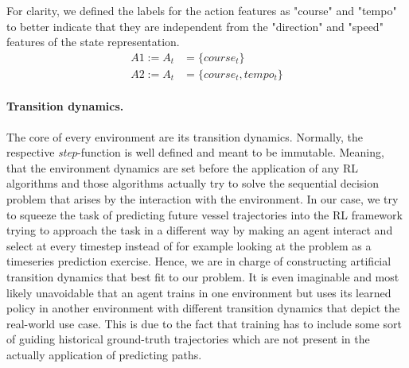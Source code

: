 For clarity, we defined the labels for the action features as "course" and "tempo" to better indicate that they are independent from the "direction" and "speed" features of the state representation.
\begin{equation}
\begin{aligned}
    A1 := A_t &= \{course_t\}
\\
    A2 := A_t &= \{course_t, tempo_t\}
    \end{aligned}
\end{equation}

\paragraph{Transition dynamics.} The core of every environment are its transition dynamics. Normally, the respective \textit{step}-function is well defined and meant to be immutable. Meaning, that the environment dynamics are set before the application of any RL algorithms and those algorithms actually try to solve the sequential decision problem that arises by the interaction with the environment. In our case, we try to squeeze the task of predicting future vessel trajectories into the RL framework trying to approach the task in a different way by making an agent interact and select at every timestep instead of for example looking at the problem as a timeseries prediction exercise. Hence, we are in charge of constructing artificial transition dynamics that best fit to our problem. It is even imaginable and most likely unavoidable that an agent trains in one environment but uses its learned policy in another environment with different transition dynamics that depict the real-world use case. This is due to the fact that training has to include some sort of guiding historical ground-truth trajectories which are not present in the actually application of predicting paths.
\par
